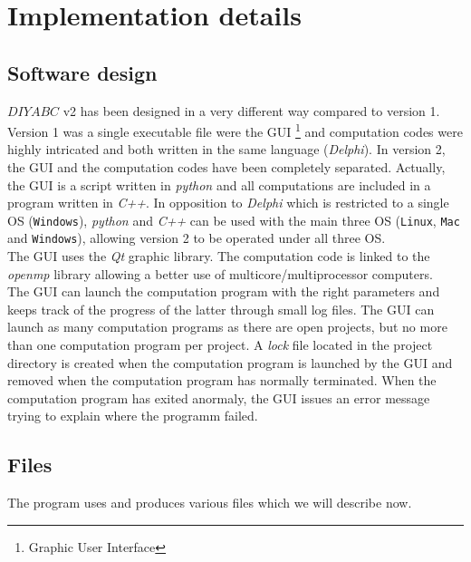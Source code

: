 \clearpage
\section{Implementation details}
\subsection{Software design}
$DIYABC$ v2 has been designed in a very different way compared to version 1. Version 1 was a single executable file were the GUI \footnote{Graphic User Interface} and computation codes were highly intricated and both written in the same language (\emph{Delphi}). In version 2, the GUI and the computation codes have been completely separated. Actually, the GUI is a script written in \emph{python} and all computations are included in a program written in \emph{C++}. In opposition to \emph{Delphi} which is restricted to a single OS (\texttt{Windows}), \textit{python} and \textit{C++} can be used with the main three OS (\texttt{Linux}, \texttt{Mac} and \texttt{Windows}), allowing version 2  to be operated under all three OS.\\
The GUI uses the \textit{Qt} graphic library. The computation code is linked to the \textit{openmp} library allowing a better use of multicore/multiprocessor computers.\\
The GUI can launch the computation program with the right parameters and keeps track of the progress of the latter through small log files. The GUI can launch as many computation programs as there are open projects, but no more than one computation program per project. A \textit{lock} file located in the project directory is created when the computation program is launched by the GUI and removed when the computation program has normally terminated. When the computation program has exited anormaly, the GUI issues an error message trying to explain where the programm failed.    
\subsection{Files}
The program uses and produces various files which we will describe now.
